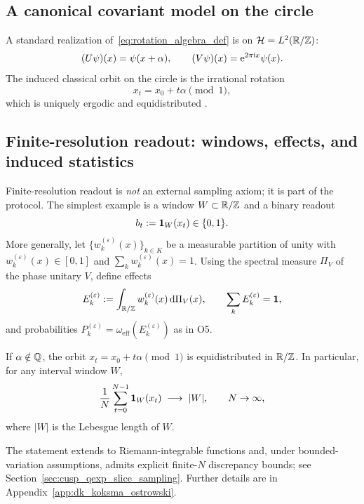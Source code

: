 \subsection{A canonical covariant model on the circle}
\label{sec:covariant_model}

A standard realization of~\eqref{eq:rotation_algebra_def} is on $\mathcal{H}=L^2(\mathbb{R}/\mathbb{Z})$:
\begin{equation}
\label{eq:covariant_model}
(U\psi)(x)=\psi(x+\alpha),\qquad (V\psi)(x)=\mathrm{e}^{2\pi\mathrm{i} x}\psi(x).
\end{equation}
The induced classical orbit on the circle is the irrational rotation
\begin{equation}
x_t = x_0 + t\alpha \pmod 1,
\end{equation}
which is uniquely ergodic and equidistributed \cite{Denjoy1932,KatokHasselblatt1995,Weyl1916,KuipersNiederreiter1974}.

\subsection{Finite-resolution readout: windows, effects, and induced statistics}
\label{sec:finite_resolution_readout}

Finite-resolution readout is \emph{not} an external sampling axiom; it is part of the protocol.
The simplest example is a window $W\subset\mathbb{R}/\mathbb{Z}$ and a binary readout
\begin{equation}
b_t := \mathbf{1}_W(x_t)\in\{0,1\}.
\end{equation}
More generally, let $\{w_k^{(\varepsilon)}(x)\}_{k\in K}$ be a measurable partition of unity with $w_k^{(\varepsilon)}(x)\in[0,1]$ and $\sum_k w_k^{(\varepsilon)}(x)=1$. Using the spectral measure $\Pi_V$ of the phase unitary $V$, define effects
\begin{equation}
E_k^{(\varepsilon)} := \int_{\mathbb{R}/\mathbb{Z}} w_k^{(\varepsilon)}(x)\,\mathrm{d} \Pi_V(x),\qquad \sum_k E_k^{(\varepsilon)}=\mathbf{1},
\end{equation}
and probabilities $P_k^{(\varepsilon)}=\omega_{\mathrm{eff}}(E_k^{(\varepsilon)})$ as in O5.

\begin{theorem}
\label{thm:weyl_equidistribution}
If $\alpha\notin\mathbb{Q}$, the orbit $x_t=x_0+t\alpha\pmod 1$ is equidistributed in $\mathbb{R}/\mathbb{Z}$. In particular, for any interval window $W$,
\begin{equation}
\frac{1}{N}\sum_{t=0}^{N-1}\mathbf{1}_W(x_t)\;\longrightarrow\; |W|,\qquad N\to\infty,
\end{equation}
where $|W|$ is the Lebesgue length of $W$.
\end{theorem}
\begin{remark}
The statement extends to Riemann-integrable functions and, under bounded-variation assumptions, admits explicit finite-$N$ discrepancy bounds; see Section~\ref{sec:cusp_qexp_slice_sampling}. Further details are in Appendix~\ref{app:dk_koksma_ostrowski}.
\end{remark}

